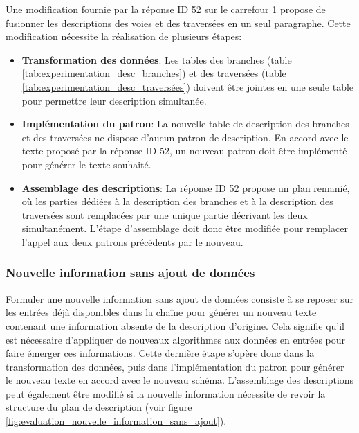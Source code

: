 \newpar{}

Une modification fournie par la réponse ID 52 sur le carrefour 1 propose de fusionner les descriptions des voies et des traversées en un seul paragraphe. Cette modification nécessite la réalisation de plusieurs étapes:

\begin{itemize}
    \item \textbf{Transformation des données}: Les tables des branches (table \ref{tab:experimentation_desc_branches}) et des traversées (table \ref{tab:experimentation_desc_traversées}) doivent être jointes en une seule table pour permettre leur description simultanée.
    \item \textbf{Implémentation du patron}: La nouvelle table de description des branches et des traversées ne dispose d'aucun patron de description. En accord avec le texte proposé par la réponse ID 52, un nouveau patron doit être implémenté pour générer le texte souhaité.
    \item \textbf{Assemblage des descriptions}: La réponse ID 52 propose un plan remanié, où les parties dédiées à la description des branches et à la description des traversées sont remplacées par une unique partie décrivant les deux simultanément. L'étape d'assemblage doit donc être modifiée pour remplacer l'appel aux deux patrons précédents par le nouveau.
\end{itemize}

\subsubsection{Nouvelle information sans ajout de données}

Formuler une nouvelle information sans ajout de données consiste à se reposer sur les entrées déjà disponibles dans la chaîne pour générer un nouveau texte contenant une information absente de la description d'origine. Cela signifie qu'il est nécessaire d'appliquer de nouveaux algorithmes aux données en entrées pour faire émerger ces informations. Cette dernière étape s'opère donc dans la transformation des données, puis dans l'implémentation du patron pour générer le nouveau texte en accord avec le nouveau schéma. L'assemblage des descriptions peut également être modifié si la nouvelle information nécessite de revoir la structure du plan de description (voir figure \ref{fig:evaluation_nouvelle_information_sans_ajout}).

